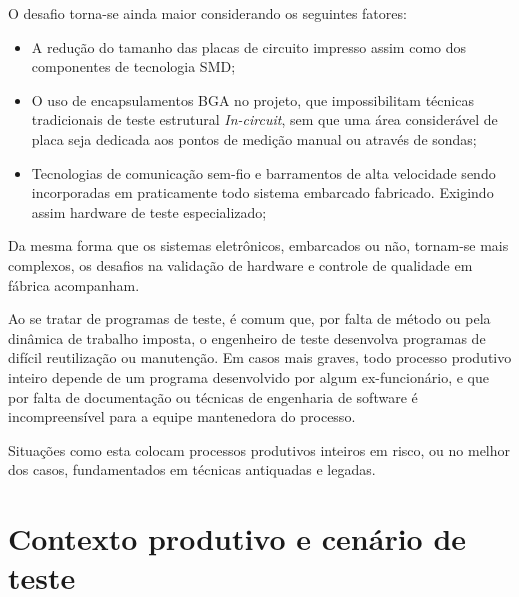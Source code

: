     O desafio torna-se ainda maior considerando os seguintes fatores:
    \begin{itemize}
        \item A redução do tamanho das placas de circuito impresso assim como dos componentes de tecnologia SMD;
        \item O uso de encapsulamentos BGA no projeto, que impossibilitam técnicas tradicionais de teste estrutural \textit{In-circuit}, sem que uma área considerável de placa seja dedicada aos pontos de medição manual ou através de sondas;
        \item Tecnologias de comunicação sem-fio e barramentos de alta velocidade sendo incorporadas em praticamente todo sistema embarcado fabricado. Exigindo assim hardware de teste especializado;
    \end{itemize}
    
    Da mesma forma que os sistemas eletrônicos, embarcados ou não, tornam-se mais complexos, os desafios na validação de hardware e controle de qualidade em fábrica acompanham. 
    
    Ao se tratar de programas de teste, é comum que, por falta de método ou pela dinâmica de trabalho imposta, o engenheiro de teste desenvolva programas de difícil reutilização ou manutenção. Em casos mais graves, todo processo produtivo inteiro depende de um programa desenvolvido por algum ex-funcionário, e que por falta de documentação ou técnicas de engenharia de software é incompreensível para a equipe mantenedora do processo. 
    
    Situações como esta colocam processos produtivos inteiros em risco, ou no melhor dos casos, fundamentados em técnicas antiquadas e legadas.
      


\section{Contexto produtivo e cenário de teste}


